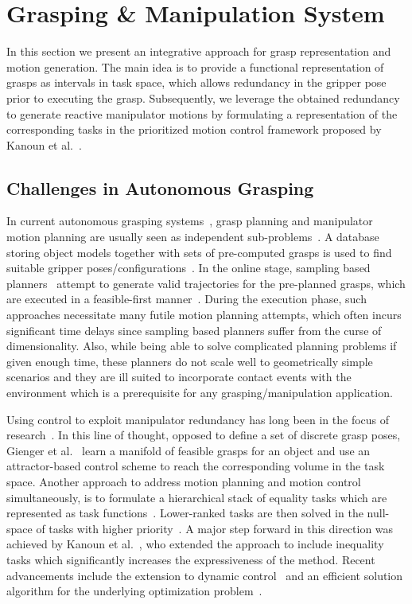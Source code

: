
\section{Grasping \& Manipulation System}
\label{sec:manip}
%
In this section we present an integrative approach for grasp representation and motion
generation. The main idea is to provide a functional representation of grasps as intervals in task
space, which allows redundancy in the gripper pose prior to executing the grasp. Subsequently, we
leverage the obtained redundancy to generate reactive manipulator motions by formulating a
representation of the corresponding tasks in the prioritized motion control framework proposed by
Kanoun et al.~\cite{Kano11}.
%
\subsection{Challenges in Autonomous Grasping}
\label{subsec:Grasping_challenges}
%
In current autonomous grasping systems~\cite{Bere07, Srin10, Krug14a}, grasp planning and
manipulator motion planning are usually seen as independent sub-problems~\cite{Dian10}. A database
storing object models together with sets of pre-computed grasps is used to find suitable gripper
poses/configurations~\cite{Mill04, Gold11, Krug14a}. In the online stage, sampling based
planners~\cite{LaVa06} attempt to generate valid trajectories for the pre-planned grasps, which are
executed in a feasible-first manner~\cite{Bere07}. During the execution phase, such approaches
necessitate many futile motion planning attempts, which often incurs significant time delays since
sampling based planners suffer from the curse of dimensionality. Also, while being able to solve
complicated planning problems if given enough time, these planners do not scale well to
geometrically simple scenarios and they are ill suited to incorporate contact events with the
environment which is a prerequisite for any grasping/manipulation application.

Using control to exploit manipulator redundancy has long been in the focus of research~\cite{Sici91,
  Sent10}. In this line of thought, opposed to define a set of discrete grasp poses, Gienger et
al.~\cite{Gien08a, Gien08b} learn a manifold of feasible grasps for an object and use an
attractor-based control scheme to reach the corresponding volume in the task space. Another approach
to address motion planning and motion control simultaneously, is to formulate a hierarchical stack
of equality tasks which are represented as task functions~\cite{Sams91}. Lower-ranked tasks are then
solved in the null-space of tasks with higher priority~\cite{Sici91, Sent10}. A major step forward
in this direction was achieved by Kanoun et al.~\cite{Kano11}, who extended the approach to include
inequality tasks which significantly increases the expressiveness of the method. Recent advancements
include the extension to dynamic control~\cite{Saab13} and an efficient solution algorithm for the
underlying optimization problem~\cite{Esca14}.
%
